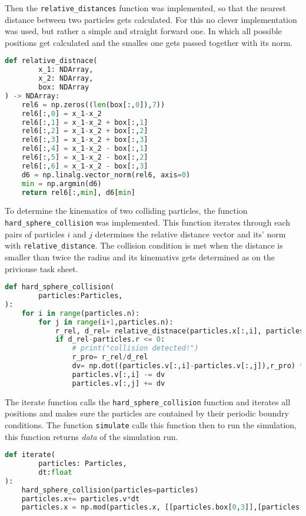 \documentclass{article}[a4paper]
\begin{document}
Then the \texttt{relative\_distances} function was implemented, so that the nearest distance between two particles gets calculated. 
For this no clever implementation was used, but rather a simple and straight forward one. 
In which all possible positions get calculated and the smalles one gets passed together with its norm.
\begin{lstlisting}[language=Python]
def relative_distnace(
        x_1: NDArray,
        x_2: NDArray,
        box: NDArray
) -> NDArray:
    rel6 = np.zeros((len(box[:,0]),7))
    rel6[:,0] = x_1-x_2 
    rel6[:,1] = x_1-x_2 + box[:,1]
    rel6[:,2] = x_1-x_2 + box[:,2]
    rel6[:,3] = x_1-x_2 + box[:,3]
    rel6[:,4] = x_1-x_2 - box[:,1]
    rel6[:,5] = x_1-x_2 - box[:,2]
    rel6[:,6] = x_1-x_2 - box[:,3]
    d6 = np.linalg.vector_norm(rel6, axis=0)
    min = np.argmin(d6)
    return rel6[:,min], d6[min]
\end{lstlisting}

To determine the kinematics of two colliding particles, the function \texttt{hard\_sphere\_collision} was implemented. 
This function iterates through each pairs of particles $i$ and $j$ determines the relative distance vector and its' norm with \texttt{relative\_distance}. 
The collision condition is met when the distance is smaller than twice the radius and its kinemativs gets determined as on the priviouse task sheet. 
\begin{lstlisting}[language=Python]
def hard_sphere_collision(
        particles:Particles,
):
    for i in range(particles.n):
        for j in range(i+1,particles.n):
            r_rel, d_rel= relative_distnace(particles.x[:,i], particles.x[:,j],particles.box) 
            if d_rel-particles.r <= 0:
                # print("collision detected!")
                r_pro= r_rel/d_rel
                dv= np.dot((particles.v[:,i]-particles.v[:,j]),r_pro) * r_pro
                particles.v[:,i] -= dv
                particles.v[:,j] += dv
\end{lstlisting}

The iterate function calls the \texttt{hard\_sphere\_collision} function and iterates all positions and makes sure the particles are contained by their periodic boundry conditions. The function \texttt{simulate} calls this function then to run the simulation, this function returns \textit{data} of the simulation run.
\begin{lstlisting}[language=Python]
def iterate(
        particles: Particles,
        dt:float
):
    hard_sphere_collision(particles=particles)
    particles.x+= particles.v*dt  
    particles.x = np.mod(particles.x, [[particles.box[0,3]],[particles.box[1,3]]]) 
\end{lstlisting}
\end{document}

